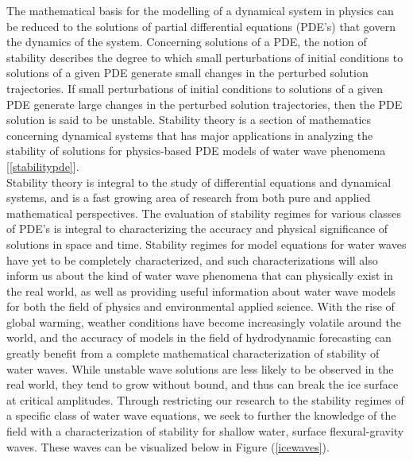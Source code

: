 \documentclass{article}
\begin{document}
The mathematical basis for the modelling of a dynamical system in physics can be reduced to the solutions of partial differential equations (PDE’s) that govern the dynamics of the system. Concerning solutions of a PDE, the notion of stability describes the degree to which small perturbations of initial conditions to solutions of a given PDE generate small changes in the perturbed solution trajectories. If small perturbations of initial conditions to solutions of a given PDE generate large changes in the perturbed solution trajectories, then the PDE solution is said to be unstable. Stability theory is a section of mathematics concerning dynamical systems that has major applications in analyzing the stability of solutions for physics-based PDE models of water wave phenomena [\ref{stabilitypde}]. \\

Stability theory is integral to the study of differential equations and dynamical systems, and is a fast growing area of research from both pure and applied mathematical perspectives. The evaluation of stability regimes for various classes of PDE’s is integral to characterizing the accuracy and physical significance of solutions in space and time. Stability regimes for model equations for water waves have yet to be completely characterized, and such characterizations will also inform us about the kind of water wave phenomena that can physically exist in the real world, as well as providing useful information about water wave models for both the field of physics and environmental applied science. With the rise of global warming, weather conditions have become increasingly volatile around the world, and the accuracy of models in the field of hydrodynamic forecasting can greatly benefit from a complete mathematical characterization of stability of water waves. While unstable wave solutions are less likely to be observed in the real world, they tend to grow without bound, and thus can break the ice surface at critical amplitudes. Through restricting our research to the stability regimes of a specific class of water wave equations, we seek to further the knowledge of the field with a characterization of stability for shallow water, surface flexural-gravity waves. These waves can be visualized below in Figure (\ref{icewaves}). \\
\end{document}
